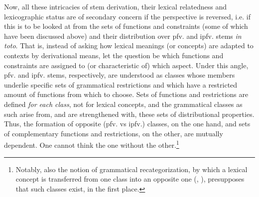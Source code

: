 \documentclass[output=paper]{langscibook}
\begin{document}
Now, all these intricacies of stem derivation, their lexical relatedness and lexicographic status are of secondary concern if the perspective is reversed, i.e. if this is to be looked at from the sets of functions and constraints (some of which have been discussed above) and their distribution over pfv. and ipfv. stems \textit{in toto}. That is, instead of asking how lexical meanings (or concepts) are adapted to contexts by derivational means, let the question be which functions and constraints are assigned to (or characteristic of) which aspect. Under this angle, pfv. and ipfv. stems, respectively, are understood as classes whose members underlie specific sets of grammatical restrictions and which have a restricted amount of functions from which to choose. Sets of functions and restrictions are defined \textit{for each class}, not for lexical concepts, and the grammatical classes as such arise from, and are strengthened with, these sets of distributional properties. Thus, the formation of opposite (pfv. vs ipfv.) classes, on the one hand, and sets of complementary functions and restrictions, on the other, are mutually dependent. One cannot think the one without the other.\footnote{Notably, also the notion of grammatical recategorization, by which a lexical concept is transferred from one class into an opposite one (\citealt{Lehmann1999}, \citealt{Mende1999}), presupposes that such classes exist, in the first place.} 
\end{document}
